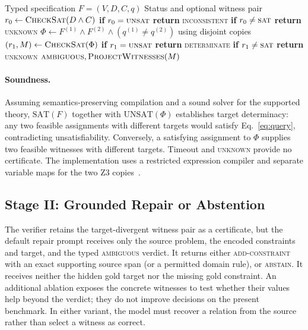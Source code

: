 \documentclass[sigconf,anonymous]{aamas}
\begin{document}
\begin{algorithm}[H]
\caption{Target-determinacy verification}
\label{alg:verify}
\footnotesize
\begin{algorithmic}[1]
\Require Typed specification $F=(V,D,C,q)$
\Ensure Status and optional witness pair
\State $r_0 \gets \Call{CheckSat}{D\land C}$
\State \textbf{if} $r_0=\textsc{unsat}$ \textbf{return} \textsc{inconsistent}
\State \textbf{if} $r_0\neq\textsc{sat}$ \textbf{return} \textsc{unknown}
\State $\Phi\gets F^{(1)}\land F^{(2)}\land(q^{(1)}\neq q^{(2)})$ using disjoint copies
\State $(r_1,M) \gets \Call{CheckSat}{\Phi}$
\State \textbf{if} $r_1=\textsc{unsat}$ \textbf{return} \textsc{determinate}
\State \textbf{if} $r_1\neq\textsc{sat}$ \textbf{return} \textsc{unknown}
\State \Return $\textsc{ambiguous},\Call{ProjectWitnesses}{M}$
\end{algorithmic}
\end{algorithm}

\paragraph{Soundness.}
Assuming semantics-preserving compilation and a sound solver for the supported theory, $\mathrm{SAT}(F)$ together with $\mathrm{UNSAT}(\Phi)$ establishes target determinacy: any two feasible assignments with different targets would satisfy Eq.~\eqref{eq:query}, contradicting unsatisfiability. Conversely, a satisfying assignment to $\Phi$ supplies two feasible witnesses with different targets. Timeout and \textsc{unknown} provide no certificate. The implementation uses a restricted expression compiler and separate variable maps for the two Z3 copies~\cite{demoura2008z3}.

\subsection{Stage II: Grounded Repair or Abstention}
The verifier retains the target-divergent witness pair as a certificate, but the default repair prompt receives only the source problem, the encoded constraints and target, and the typed \textsc{ambiguous} verdict. It returns either \textsc{add-constraint} with an exact supporting source span (or a permitted domain rule), or \textsc{abstain}. It receives neither the hidden gold target nor the missing gold constraint. An additional ablation exposes the concrete witnesses to test whether their values help beyond the verdict; they do not improve decisions on the present benchmark. In either variant, the model must recover a relation from the source rather than select a witness as correct.
\end{document}
